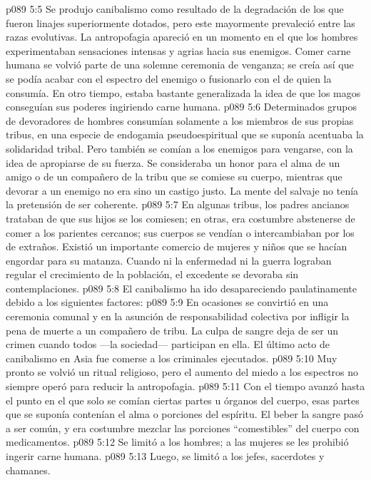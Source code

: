 \vs p089 5:5 Se produjo canibalismo como resultado de la degradación de los que fueron linajes superiormente dotados, pero este mayormente prevaleció entre las razas evolutivas. La antropofagia apareció en un momento en el que los hombres experimentaban sensaciones intensas y agrias hacia sus enemigos. Comer carne humana se volvió parte de una solemne ceremonia de venganza; se creía así que se podía acabar con el espectro del enemigo o fusionarlo con el de quien la consumía. En otro tiempo, estaba bastante generalizada la idea de que los magos conseguían sus poderes ingiriendo carne humana.
\vs p089 5:6 Determinados grupos de devoradores de hombres consumían solamente a los miembros de sus propias tribus, en una especie de endogamia pseudoespiritual que se suponía acentuaba la solidaridad tribal. Pero también se comían a los enemigos para vengarse, con la idea de apropiarse de su fuerza. Se consideraba un honor para el alma de un amigo o de un compañero de la tribu que se comiese su cuerpo, mientras que devorar a un enemigo no era sino un castigo justo. La mente del salvaje no tenía la pretensión de ser coherente.
\vs p089 5:7 En algunas tribus, los padres ancianos trataban de que sus hijos se los comiesen; en otras, era costumbre abstenerse de comer a los parientes cercanos; sus cuerpos se vendían o intercambiaban por los de extraños. Existió un importante comercio de mujeres y niños que se hacían engordar para su matanza. Cuando ni la enfermedad ni la guerra lograban regular el crecimiento de la población, el excedente se devoraba sin contemplaciones.
\vs p089 5:8 \pc El canibalismo ha ido desapareciendo paulatinamente debido a los siguientes factores:
\vs p089 5:9 En ocasiones se convirtió en una ceremonia comunal y en la asunción de responsabilidad colectiva por infligir la pena de muerte a un compañero de tribu. La culpa de sangre deja de ser un crimen cuando todos ---la sociedad--- participan en ella. El último acto de canibalismo en Asia fue comerse a los criminales ejecutados.
\vs p089 5:10 Muy pronto se volvió un ritual religioso, pero el aumento del miedo a los espectros no siempre operó para reducir la antropofagia.
\vs p089 5:11 Con el tiempo avanzó hasta el punto en el que solo se comían ciertas partes u órganos del cuerpo, esas partes que se suponía contenían el alma o porciones del espíritu. El beber la sangre pasó a ser común, y era costumbre mezclar las porciones “comestibles” del cuerpo con medicamentos.
\vs p089 5:12 Se limitó a los hombres; a las mujeres se les prohibió ingerir carne humana.
\vs p089 5:13 Luego, se limitó a los jefes, sacerdotes y chamanes.
